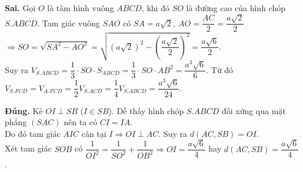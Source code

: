 \begin{ex}
{\begin{itemchoice}
			\itemch \textbf{Sai.} Gọi $O$ là tâm hình vuông $ABCD$, khi đó $SO$ là đường cao của hình chóp $S.ABCD$.
			Tam giác vuông $SAO$ có $SA = a \sqrt{2},\ AO = \dfrac{AC}{2} = \dfrac{a \sqrt{2}}{2}$ \\
			$\Rightarrow SO = \sqrt{SA^2 - AO^2} = \sqrt{\left( a \sqrt{2} \right)^2 - \left( \dfrac{a \sqrt{2}}{2} \right)^2} = \dfrac{a \sqrt{6}}{2}.$ \\
			Suy ra $V_{S.ABCD} = \dfrac{1}{3} \cdot SO \cdot S_{ABCD} = \dfrac{1}{3} \cdot SO \cdot AB^2 = \dfrac{a^3\sqrt{6}}{6}$.
			Từ đó $V_{S.FCD} = V_{A.FCD} = \dfrac{1}{2}V_{S.ACD} = \dfrac{1}{4}V_{S.ABCD} = \dfrac{a^3\sqrt{6}}{24}$.
			
			\itemch \textbf{Đúng.} Kẻ $OI \perp SB$ ($I \in SB$). Dễ thấy hình chóp $S.ABCD$ đối xứng qua mặt phẳng $(SAC)$ nên ta có $CI = IA$. \\
			Do đó tam giác $AIC$ cân tại $I \Rightarrow OI \perp AC$. Suy ra $d(AC, SB) = OI$. \\
			Xét tam giác $SOB$ có $\dfrac{1}{OI^2} = \dfrac{1}{SO^2} + \dfrac{1}{OB^2} \Rightarrow OI = \dfrac{a \sqrt{6}}{4}$ hay $d(AC, SB) = \dfrac{a \sqrt{6}}{4}$.
		\end{itemchoice}
	}
\end{ex}

